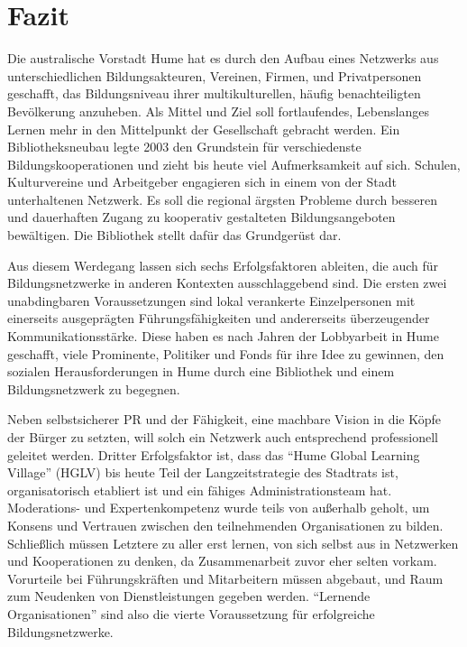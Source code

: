 \documentclass[a4paper,
fontsize=11pt,
oneside,
numbers=noperiodatend,
parskip=half-,
bibliography=totoc,
final
]{scrartcl}
\begin{document}
\hypertarget{fazit}{%
\section{Fazit}\label{fazit}}

Die australische Vorstadt Hume hat es durch den Aufbau eines Netzwerks
aus unterschiedlichen Bildungsakteuren, Vereinen, Firmen, und
Privatpersonen geschafft, das Bildungsniveau ihrer multikulturellen,
häufig benachteiligten Bevölkerung anzuheben. Als Mittel und Ziel soll
fortlaufendes, Lebenslanges Lernen mehr in den Mittelpunkt der
Gesellschaft gebracht werden. Ein Bibliotheksneubau legte 2003 den
Grundstein für verschiedenste Bildungskooperationen und zieht bis heute
viel Aufmerksamkeit auf sich. Schulen, Kulturvereine und Arbeitgeber
engagieren sich in einem von der Stadt unterhaltenen Netzwerk. Es soll
die regional ärgsten Probleme durch besseren und dauerhaften Zugang zu
kooperativ gestalteten Bildungsangeboten bewältigen. Die Bibliothek
stellt dafür das Grundgerüst dar.

Aus diesem Werdegang lassen sich sechs Erfolgsfaktoren ableiten, die
auch für Bildungsnetzwerke in anderen Kontexten ausschlaggebend sind.
Die ersten zwei unabdingbaren Voraussetzungen sind lokal verankerte
Einzelpersonen mit einerseits ausgeprägten Führungsfähigkeiten und
andererseits überzeugender Kommunikationsstärke. Diese haben es nach
Jahren der Lobbyarbeit in Hume geschafft, viele Prominente, Politiker
und Fonds für ihre Idee zu gewinnen, den sozialen Herausforderungen in
Hume durch eine Bibliothek und einem Bildungsnetzwerk zu begegnen.

Neben selbstsicherer PR und der Fähigkeit, eine machbare Vision in die
Köpfe der Bürger zu setzten, will solch ein Netzwerk auch entsprechend
professionell geleitet werden. Dritter Erfolgsfaktor ist, dass das
\enquote{Hume Global Learning Village} (HGLV) bis heute Teil der
Langzeitstrategie des Stadtrats ist, organisatorisch etabliert ist und
ein fähiges Administrationsteam hat. Moderations- und Expertenkompetenz
wurde teils von außerhalb geholt, um Konsens und Vertrauen zwischen den
teilnehmenden Organisationen zu bilden. Schließlich müssen Letztere zu
aller erst lernen, von sich selbst aus in Netzwerken und Kooperationen
zu denken, da Zusammenarbeit zuvor eher selten vorkam. Vorurteile bei
Führungskräften und Mitarbeitern müssen abgebaut, und Raum zum Neudenken
von Dienstleistungen gegeben werden. \enquote{Lernende Organisationen}
sind also die vierte Voraussetzung für erfolgreiche Bildungsnetzwerke.
\end{document}
